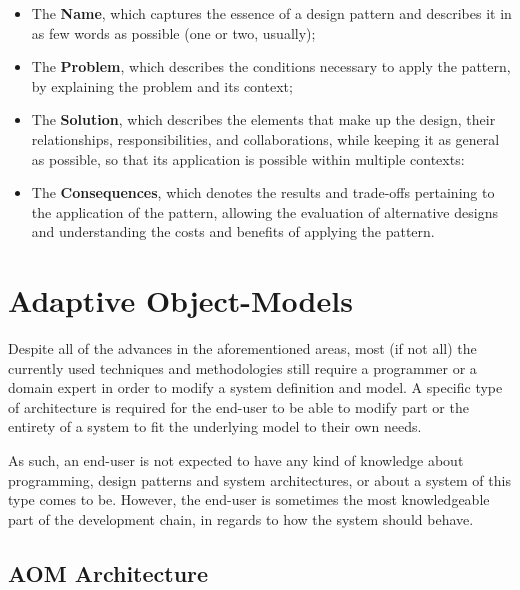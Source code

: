 \begin{itemize}
  \item The \textbf{Name}, which captures the essence of a design pattern and describes it in as few words as possible (one or two, usually); \\
  \item The \textbf{Problem}, which describes the conditions necessary to apply the pattern, by explaining the problem and its context; \\
  \item The \textbf{Solution}, which describes the elements that make up the design, their relationships, responsibilities, and collaborations, while keeping it as general as possible, so that its application is possible within multiple contexts: \\
  \item The \textbf{Consequences}, which denotes the results and trade-offs pertaining to the application of the pattern, allowing the evaluation of alternative designs and understanding the costs and benefits of applying the pattern. \\
\end{itemize}

\section{Adaptive Object-Models}\label{sec:aom}

Despite all of the advances in the aforementioned areas, most (if not all) the currently used techniques and methodologies still require a programmer or a domain expert in order to modify a system definition and model. A specific type of architecture is required for the end-user to be able to modify part or the entirety of a system to fit the underlying model to their own needs.

As such, an end-user is not expected to have any kind of knowledge about programming, design patterns and system architectures, or about a system of this type comes to be. However, the end-user is sometimes the most knowledgeable part of the development chain, in regards to how the system should behave.

\subsection{AOM Architecture}\label{sec:aom_architecture}

